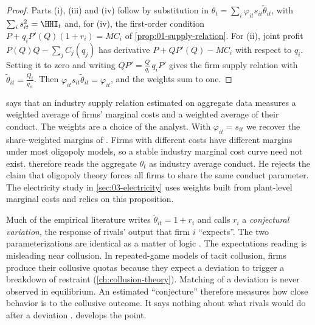 \begin{proof}
Parts (i), (iii) and (iv) follow by substitution in $\theta_t = \sum_i \varphi_{it} s_{it}\tilde\theta_{it}$, with
$\sum_i s_{it}^2 = \HHI_t$ and, for (iv), the first-order condition
$P + q_i P'(Q)(1 + r_i) = MC_i$ of \cref{prop:01-supply-relation}. For (ii), joint profit
$P(Q)Q - \sum_j C_j(q_j)$ has derivative $P + Q P'(Q) - MC_i$ with respect to $q_i$. Setting it to zero and writing
$Q P' = \frac{Q}{q_i}\, q_i P'$ gives the firm supply relation with $\tilde\theta_{it} = \frac{Q_t}{q_{it}}$. Then
$\varphi_{it} s_{it} \tilde\theta_{it} = \varphi_{it}$, and the weights sum to one.
\end{proof}

\begin{remark}\label{rem:03-average-conduct}
 says that an industry supply relation estimated on aggregate data measures a weighted
average of firms' marginal costs and a weighted average of their conduct. The weights are a choice of the analyst.
With $\varphi_{it} = s_{it}$ we recover the share-weighted margins of \citet{CowlingWaterson1976}. Firms with
different costs have different margins under most oligopoly models, so a stable industry marginal cost curve need not
exist. \citet[p.~1030]{Bresnahan1989} therefore reads the aggregate $\theta_t$ as industry average conduct. He rejects
the claim that oligopoly theory forces all firms to share the same conduct parameter. The electricity study in
\cref{sec:03-electricity} uses weights built from plant-level marginal costs and relies on this proposition.
\end{remark}

\begin{remark}\label{rem:03-cv-language}
Much of the empirical literature writes $\tilde\theta_{it} = 1 + r_i$ and calls $r_i$ a \emph{conjectural variation},
the response of rivals' output that firm $i$ ``expects''. The two parameterizations are identical as a matter of logic
\citep[p.~1027]{Bresnahan1989}. The expectations reading is misleading near collusion. In repeated-game models of
tacit collusion, firms produce their collusive quotas because they expect a deviation to trigger a breakdown of
restraint (\cref{ch:collusion-theory}). Matching of a deviation is never observed in equilibrium. An estimated
``conjecture'' therefore measures how close behavior is to the collusive outcome. It says nothing about what rivals
would do after a deviation \citep[pp.~1028--1029]{Bresnahan1989}.  develops the point.
\end{remark}

